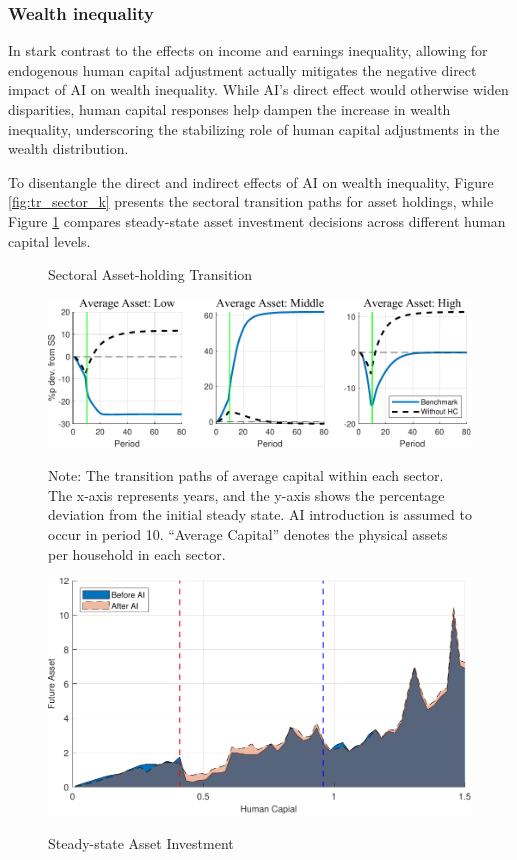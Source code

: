 \documentclass[12pt]{article}
\begin{document}
\subsubsection{Wealth inequality} 

In stark contrast to the effects on income and earnings inequality, allowing for endogenous human capital adjustment actually mitigates the negative direct impact of AI on wealth inequality. While AI’s direct effect would otherwise widen disparities, human capital responses help dampen the increase in wealth inequality, underscoring the stabilizing role of human capital adjustments in the wealth distribution.

To disentangle the direct and indirect effects of AI on wealth inequality, Figure \ref{fig:tr_sector_k} presents the sectoral transition paths for asset holdings, while Figure \ref{fig:aprime_h} compares steady-state asset investment decisions across different human capital levels.
\begin{figure}
\begin{centering}

    \caption{\protect\label{fig:tr_sector_k}Sectoral Asset-holding Transition}
\includegraphics[width=0.9\linewidth]{figure_204040calib/nohc_asset.pdf}
\par\end{centering}

{\scriptsize Note: The transition paths of average capital within each sector. The x-axis represents years, and the y-axis shows the percentage deviation from the initial steady state. AI introduction is assumed to occur in period 10. “Average Capital” denotes the physical assets per household in each sector. }{\scriptsize\par}
\centering
\caption{Steady-state Asset Investment}
    \includegraphics[width=0.9\linewidth]{figure_204040calib/DR_a.pdf}    
    \label{fig:aprime_h}    
 
\end{figure}
\end{document}
